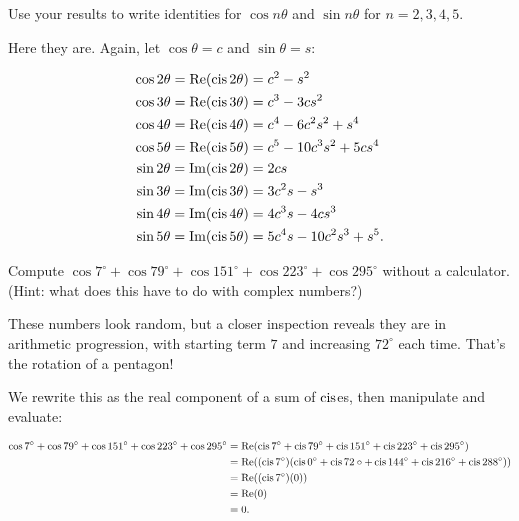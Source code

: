 \documentclass[../gatm_answers.tex]{subfiles}
\begin{document}
\begin{inner_problem}
\item Use your results to write identities for $\cos n\theta$ and $\sin n\theta$ for $n=2,3,4,5$.
\end{inner_problem}

Here they are. Again, let $\cos\theta = c$ and $\sin\theta = s$:

\begin{align*}
\cos 2\theta = \operatorname{Re}(\operatorname{cis} 2\theta) &= c^2 - s^2 \\
\cos 3\theta = \operatorname{Re}(\operatorname{cis} 3\theta) &= c^3 - 3cs^2 \\
\cos 4\theta = \operatorname{Re}(\operatorname{cis} 4\theta) &= c^4 - 6c^2s^2 + s^4 \\
\cos 5\theta = \operatorname{Re}(\operatorname{cis} 5\theta) &= c^5 - 10c^3s^2 + 5cs^4 \\
\sin 2\theta = \operatorname{Im}(\operatorname{cis} 2\theta) &= 2cs \\
\sin 3\theta = \operatorname{Im}(\operatorname{cis} 3\theta) &= 3c^2s - s^3 \\
\sin 4\theta = \operatorname{Im}(\operatorname{cis} 4\theta) &= 4c^3s - 4cs^3 \\
\sin 5\theta = \operatorname{Im}(\operatorname{cis} 5\theta) &= 5c^4s - 10c^2s^3 + s^5. \\
\end{align*}

\newcommand{\cosdeg}[1] {\cos #1^\circ}

\begin{outer_problem}
\item Compute $\cosdeg{7} + \cosdeg{79} + \cosdeg{151} + \cosdeg{223} + \cosdeg{295}$ without a calculator. (Hint: what does this have to do with complex numbers?)
\end{outer_problem}

These numbers look random, but a closer inspection reveals they are in arithmetic progression, with starting term $7$ and increasing $72^\circ$ each time. That's the rotation of a pentagon!

We rewrite this as the real component of a sum of $\operatorname{cis}$es, then manipulate and evaluate:

\begin{align*}
\cosdeg{7} + \cosdeg{79} + \cosdeg{151} + \cosdeg{223} + \cosdeg{295} &= \Real(\cis 7^\circ + \cis 79^\circ +  \cis 151^\circ +  \cis 223^\circ +  \cis 295^\circ) \\
&= \Real((\cis 7^\circ)(\cis 0^\circ + \cis 72\circ + \cis 144^\circ + \cis 216^\circ + \cis 288^\circ)) \\
&= \Real((\cis 7^\circ)(0)) \\
&= \Real(0) \\
&= 0.
\end{align*}
\end{document}
